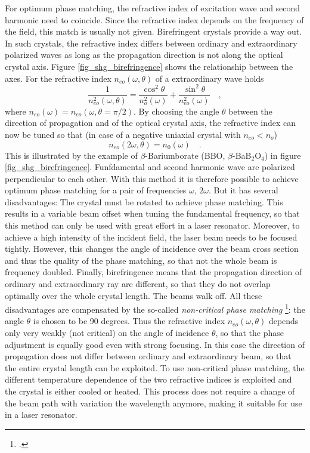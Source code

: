 For optimum phase matching, the refractive index of
excitation wave and second harmonic need to coincide. Since the
refractive index  depends on the frequency of the field, this
match is  usually not given. 
Birefringent crystals provide a way out. In such crystals, the refractive index differs  
 between ordinary and extraordinary
polarized waves as long as the propagation direction is not along the
optical crystal axis. Figure
\ref{fig_shg_birefringence} shows the relationship between
the axes. For the refractive index $n_{eo}(\omega, \theta)$ of a
extraordinary wave holds
\begin{equation}
  \frac{1}{n_{eo}^2(\omega, \theta)} = \frac{\cos^2
  \theta}{n_{o}^2(\omega)}+ \frac{\sin^2 \theta}{n_{eo}^2(\omega)} \quad
  ,
\end{equation}
where $n_{eo}(\omega) = n_{eo}(\omega, \theta = \pi/2)$. 
By choosing the 
angle $\theta$ between the direction of propagation and
of the optical crystal axis, the refractive index can now be tuned
so that (in case of a negative uniaxial crystal with
$n_{eo} < n_o$)
\begin{equation}
  n_{eo}(2 \omega, \theta) = n_0(\omega) \quad.
\end{equation}
This is illustrated by the example of $\beta$-Bariumborate (BBO,
$\beta$-BaB$_2$O$_4$) in figure
\ref{fig_shg_birefringence}. Funfdamental  and
second harmonic  wave are polarized perpendicular to each other. With
this method it is therefore possible to achieve optimum phase matching for
a pair of frequencies $\omega$, $2\omega$. But it 
has several disadvantages: The crystal must be rotated
to achieve phase matching. This results in a variable beam
offset
when tuning the fundamental frequency, so that this method can only be used with great effort in a laser
resonator. Moreover, to achieve a high intensity of the incident field, the laser beam
needs to be focused tightly. However, this changes the angle of incidence over
the beam cross section and thus the quality of the
phase matching, so that not the whole beam is frequency doubled. Finally, birefringence means that the propagation direction of  ordinary and  extraordinary ray are different, so that they do not overlap optimally over the whole crystal length. The beams walk off.
All these disadvantages are compensated by
the so-called \emph{non-critical phase matching}
\footcite{Demtroeder_laser,Hopf86}:
the angle $\theta$ is chosen to be 90 degrees. Thus the
refractive index $n_{eo}(\omega, \theta)$ depends only very weakly
(not critical) on the angle of incidence $\theta$, so that
the phase adjustment is equally good even with strong focusing. In this case
the direction of propagation does not differ between ordinary and
extraordinary beam, so that the entire crystal length
can be exploited. To use  non-critical
phase matching, the different
temperature dependence of the two refractive indices is exploited  and
the crystal is either cooled or heated. This process
does not require a change of the beam path with variation
the wavelength anymore, making it suitable for use in a
laser resonator.

